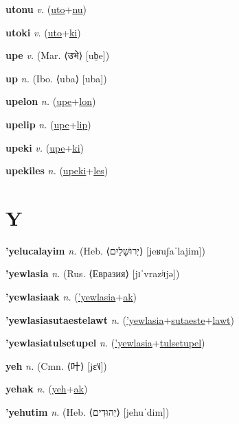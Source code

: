 \textbf{\hypertarget{utonu}{utonu}} \textit{v.} (\hyperlink{uto}{uto}+\allowbreak \hyperlink{nu}{nu})


\textbf{\hypertarget{utoki}{utoki}} \textit{v.} (\hyperlink{uto}{uto}+\allowbreak \hyperlink{ki}{ki})


\textbf{\hypertarget{upe}{upe}} \textit{v.} (Mar. ⟨{\devanagari{}उभे}⟩ [ub̤e])


\textbf{\hypertarget{up}{up}} \textit{n.} (Ibo. ⟨uba⟩ [uba])


\textbf{\hypertarget{upelon}{upelon}} \textit{n.} (\hyperlink{upe}{upe}+\allowbreak \hyperlink{lon}{lon})


\textbf{\hypertarget{upelip}{upelip}} \textit{n.} (\hyperlink{upe}{upe}+\allowbreak \hyperlink{lip}{lip})


\textbf{\hypertarget{upeki}{upeki}} \textit{v.} (\hyperlink{upe}{upe}+\allowbreak \hyperlink{ki}{ki})


\textbf{\hypertarget{upekiles}{upekiles}} \textit{n.} (\hyperlink{upeki}{upeki}+\allowbreak \hyperlink{les}{les})


\section{Y}

\textbf{\hypertarget{'yelucalayim}{'yelucalayim}} \textit{n.} (Heb. ⟨{\hebrew{}יְרוּשָׁלַיִם}⟩ [jeʁuʃaˈlajim])


\textbf{\hypertarget{'yewlasia}{'yewlasia}} \textit{n.} (Rus. ⟨Евразия⟩ [jɪˈvrazʲɪjə])


\textbf{\hypertarget{'yewlasiaak}{'yewlasiaak}} \textit{n.} (\hyperlink{'yewlasia}{'yewlasia}+\allowbreak \hyperlink{ak}{ak})


\textbf{\hypertarget{'yewlasiasutaestelawt}{'yewlasiasutaestelawt}} \textit{n.} (\hyperlink{'yewlasia}{'yewlasia}+\allowbreak \hyperlink{sutaeste}{sutaeste}+\allowbreak \hyperlink{lawt}{lawt})


\textbf{\hypertarget{'yewlasiatulsetupel}{'yewlasiatulsetupel}} \textit{n.} (\hyperlink{'yewlasia}{'yewlasia}+\allowbreak \hyperlink{tulsetupel}{tulsetupel})


\textbf{\hypertarget{yeh}{yeh}} \textit{n.} (Cmn. ⟨{\chinese{}叶}⟩ [jɛ˥˩])


\textbf{\hypertarget{yehak}{yehak}} \textit{n.} (\hyperlink{yeh}{yeh}+\allowbreak \hyperlink{ak}{ak})


\textbf{\hypertarget{'yehutim}{'yehutim}} \textit{n.} (Heb. ⟨{\hebrew{}יְהוּדִים}⟩ [jehuˈdim])


